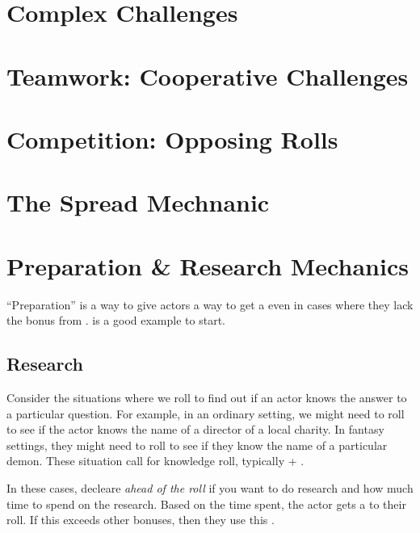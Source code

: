 \section{Complex Challenges}

\section{Teamwork: Cooperative Challenges}


\section{Competition: Opposing Rolls}

\section{The Spread Mechnanic}

\section{Preparation \& Research Mechanics}

``Preparation'' is a way to give actors a way to get a 
even in cases where they lack the bonus from .
 is a good example to start.

\subsection{Research}
\label{subsec:research_mechanic}

\begin{marginNote}
	
\end{marginNote}

Consider the situations where we roll to find out if an actor knows the answer
to a particular question. For example, in an ordinary setting, we might need
to roll to see if the actor knows the name of a director of a local charity.
In fantasy settings, they might need to roll to see if they know the name of
a particular demon. These situation call for knowledge roll, typically
 + .

In these cases, decleare \emph{ahead of the roll} if you want to do research and how
much time to spend on the research. Based on the time spent, the actor gets a 
to their roll. If this  exceeds other bonuses, then they use this
.

